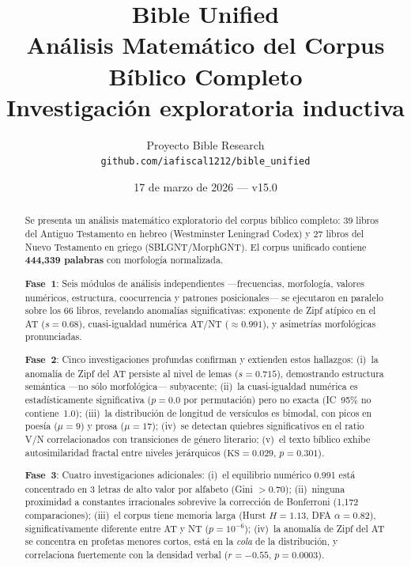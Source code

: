 \documentclass[12pt,a4paper]{article}
\title{%
  \vspace{-1cm}
  {\LARGE\bfseries Bible Unified}\\[0.3em]
  {\Large An\'alisis Matem\'atico del Corpus B\'iblico Completo}\\[0.5em]
  {\large Investigaci\'on exploratoria inductiva}\\[0.3em]
  \secline
}
\author{%
  Proyecto Bible Research\\
  \texttt{github.com/iafiscal1212/bible\_unified}
}
\date{17 de marzo de 2026 --- v15.0}
\begin{document}
\maketitle
\thispagestyle{empty}

\vspace{1cm}

\begin{abstract}
\noindent
Se presenta un an\'alisis matem\'atico exploratorio del corpus b\'iblico completo:
39 libros del Antiguo Testamento en hebreo (Westminster Leningrad Codex) y
27 libros del Nuevo Testamento en griego (SBLGNT/MorphGNT).
El corpus unificado contiene \textbf{444,339 palabras} con morfolog\'ia normalizada.

\textbf{Fase~1}: Seis m\'odulos de an\'alisis independientes ---frecuencias, morfolog\'ia,
valores num\'ericos, estructura, coocurrencia y patrones posicionales--- se ejecutaron
en paralelo sobre los 66 libros, revelando anomal\'ias significativas: exponente de Zipf
at\'ipico en el AT ($s=0.68$), cuasi-igualdad num\'erica AT/NT ($\approx 0.991$),
y asimetr\'ias morfol\'ogicas pronunciadas.

\textbf{Fase~2}: Cinco investigaciones profundas confirman y extienden estos hallazgos:
(i)~la anomal\'ia de Zipf del AT persiste al nivel de lemas ($s=0.715$), demostrando
estructura sem\'antica ---no s\'olo morfol\'ogica--- subyacente;
(ii)~la cuasi-igualdad num\'erica es estad\'isticamente significativa ($p=0.0$ por permutaci\'on)
pero no exacta (IC~95\% no contiene~1.0);
(iii)~la distribuci\'on de longitud de vers\'iculos es bimodal, con picos en poes\'ia ($\mu=9$)
y prosa ($\mu=17$);
(iv)~se detectan quiebres significativos en el ratio V/N correlacionados con transiciones
de g\'enero literario;
(v)~el texto b\'iblico exhibe autosimilaridad fractal entre niveles jer\'arquicos
($\text{KS}=0.029$, $p=0.301$).

\textbf{Fase~3}: Cuatro investigaciones adicionales:
(i)~el equilibrio num\'erico 0.991 est\'a concentrado en 3 letras de alto valor por alfabeto
(Gini $> 0.70$);
(ii)~ninguna proximidad a constantes irracionales sobrevive la correcci\'on de Bonferroni
(1,172 comparaciones);
(iii)~el corpus tiene memoria larga (Hurst $H = 1.13$, DFA $\alpha = 0.82$),
significativamente diferente entre AT y NT ($p = 10^{-6}$);
(iv)~la anomal\'ia de Zipf del AT se concentra en profetas menores cortos,
est\'a en la \emph{cola} de la distribuci\'on, y correlaciona fuertemente con la
densidad verbal ($r = -0.55$, $p = 0.0003$).


\end{abstract}
\end{document}
